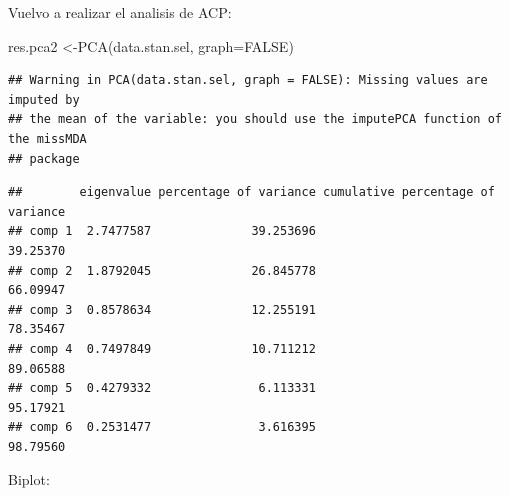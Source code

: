\documentclass[
]{book}
\newenvironment{Shaded}{\begin{snugshade}}{\end{snugshade}}
\newcommand{\AttributeTok}[1]{\textcolor[rgb]{0.77,0.63,0.00}{#1}}
\newcommand{\CommentTok}[1]{\textcolor[rgb]{0.56,0.35,0.01}{\textit{#1}}}
\newcommand{\ConstantTok}[1]{\textcolor[rgb]{0.00,0.00,0.00}{#1}}
\newcommand{\DecValTok}[1]{\textcolor[rgb]{0.00,0.00,0.81}{#1}}
\newcommand{\FunctionTok}[1]{\textcolor[rgb]{0.00,0.00,0.00}{#1}}
\newcommand{\NormalTok}[1]{#1}
\newcommand{\OtherTok}[1]{\textcolor[rgb]{0.56,0.35,0.01}{#1}}
\newcommand{\SpecialCharTok}[1]{\textcolor[rgb]{0.00,0.00,0.00}{#1}}
\newcommand{\StringTok}[1]{\textcolor[rgb]{0.31,0.60,0.02}{#1}}
\begin{document}
Vuelvo a realizar el analisis de ACP:

\begin{Shaded}
\begin{Highlighting}[]
\NormalTok{res.pca2 }\OtherTok{\textless{}{-}}\FunctionTok{PCA}\NormalTok{(data.stan.sel, }\AttributeTok{graph=}\ConstantTok{FALSE}\NormalTok{)}
\end{Highlighting}
\end{Shaded}

\begin{verbatim}
## Warning in PCA(data.stan.sel, graph = FALSE): Missing values are imputed by
## the mean of the variable: you should use the imputePCA function of the missMDA
## package
\end{verbatim}

\begin{Shaded}
\end{Shaded}

\begin{verbatim}
##        eigenvalue percentage of variance cumulative percentage of variance
## comp 1  2.7477587              39.253696                          39.25370
## comp 2  1.8792045              26.845778                          66.09947
## comp 3  0.8578634              12.255191                          78.35467
## comp 4  0.7497849              10.711212                          89.06588
## comp 5  0.4279332               6.113331                          95.17921
## comp 6  0.2531477               3.616395                          98.79560
\end{verbatim}

Biplot:

\begin{Shaded}
\end{Shaded}
\end{document}

